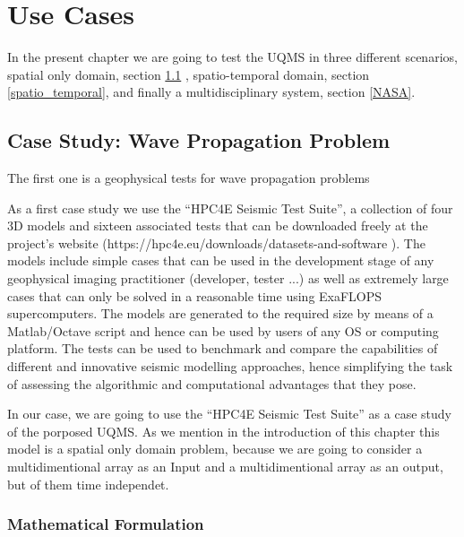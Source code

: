 \chapter[Use Cases]{Use Cases}\label{cap:use_cases}

In the present chapter we are going to test the UQMS in three different scenarios, spatial only domain, section \ref{Wave Propagation} , spatio-temporal domain, section \ref{spatio_temporal}, and finally a multidisciplinary system, section \ref{NASA}. 

\section{Case Study:  Wave Propagation Problem}\label{Wave Propagation}

The first one is a geophysical tests for wave propagation problems

As a first case study we use the “HPC4E Seismic Test Suite”, a collection of four 3D models and sixteen associated tests that can be downloaded freely at the project's website (https://hpc4e.eu/downloads/datasets-and-software ). The models include simple cases that can be used in the development stage of any geophysical imaging practitioner (developer, tester ...) as well as extremely large cases that can only be solved in a reasonable time using ExaFLOPS supercomputers. The models are generated to the required size by means of a Matlab/Octave script and hence can be used by users of any OS or computing platform. The tests can be used to benchmark and compare the capabilities of different and innovative seismic modelling approaches, hence simplifying the task of assessing the algorithmic and computational advantages that they pose. %

In our case, we are going to use the “HPC4E Seismic Test Suite” as a case study of the porposed UQMS. As we mention in the introduction of this chapter this model is a spatial only domain problem, because we are going to consider a multidimentional array as an Input and a multidimentional array as an output, but of them time independet.

\subsection{Mathematical Formulation}

